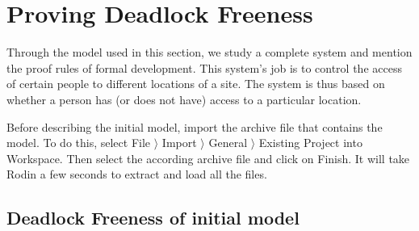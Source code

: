 \clearpage
\section{Proving Deadlock Freeness}
\label{tut_location_access_controller}




Through the model used in this section, we study a complete system and mention the proof rules of formal development. This system's job is to control the access of certain people to different locations of a site. The system is thus based on whether a person has (or does not have) access to a particular location.

Before describing the initial model, import the archive file  that contains the model. To do this, select  \textsf{File $\rangle$ Import $\rangle$ General $\rangle$ Existing Project into Workspace}. Then select the according archive file and click on \textsf{Finish}. It will take Rodin a few seconds to extract and load all the files.

\subsection{Deadlock Freeness of initial model}
\label{deadlock}
\label{tut_initial_model}


 
